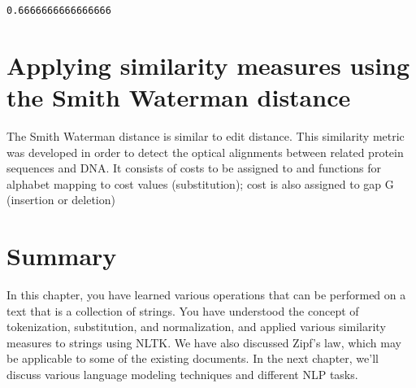 \documentclass[11pt]{article}
\begin{document}
    \begin{Verbatim}[commandchars=\\\{\}]
0.6666666666666666

    \end{Verbatim}

    \hypertarget{applying-similarity-measures-using-the-smith-waterman-distance}{%
\section{Applying similarity measures using the Smith Waterman
distance}\label{applying-similarity-measures-using-the-smith-waterman-distance}}

    The Smith Waterman distance is similar to edit distance. This similarity
metric was developed in order to detect the optical alignments between
related protein sequences and DNA. It consists of costs to be assigned
to and functions for alphabet mapping to cost values (substitution);
cost is also assigned to gap G (insertion or deletion)

    \hypertarget{summary}{%
\section{Summary}\label{summary}}

    In this chapter, you have learned various operations that can be
performed on a text that is a collection of strings. You have understood
the concept of tokenization, substitution, and normalization, and
applied various similarity measures to strings using NLTK. We have also
discussed Zipf's law, which may be applicable to some of the existing
documents. In the next chapter, we'll discuss various language modeling
techniques and different NLP tasks.


    
    
    
    
\end{document}
